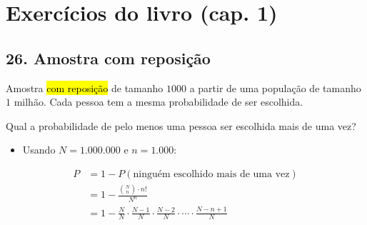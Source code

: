 \documentclass[
  11pt]{report}
\providecommand{\tightlist}{%
  \setlength{\itemsep}{0pt}\setlength{\parskip}{0pt}}
\begin{document}
\hypertarget{exercuxedcios-do-livro-cap.-1-2}{%
\section*{Exercícios do livro (cap. 1)}\label{exercuxedcios-do-livro-cap.-1-2}}

\hypertarget{amostra-com-reposiuxe7uxe3o}{%
\subsection*{26. Amostra com reposição}\label{amostra-com-reposiuxe7uxe3o}}

\begin{rmdbox}
Amostra {\hl{com reposição}} de tamanho $1000$ a partir de uma população de tamanho $1$ milhão. Cada pessoa tem a mesma probabilidade de ser escolhida.

Qual a probabilidade de pelo menos uma pessoa ser escolhida mais de uma vez?

\end{rmdbox}

\begin{itemize}
\tightlist
\item
  Usando $N = 1.000.000$ e $n = 1.000$:
\end{itemize}

\[
\begin{aligned}
P &= 1 - P(\text{ninguém escolhido mais de uma vez}) \\
  &= 1 - \frac{\binom{N}{n} \cdot n!}{N^n} \\
  &= 1 - \frac{N}{N} \cdot \frac{N - 1}{N} \cdot \frac{N - 2}{N} \cdot \cdots \cdot \frac{N - n + 1}{N}
\end{aligned}
\]
\end{document}
